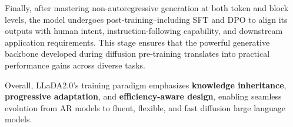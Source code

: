 Finally, after mastering non-autoregressive generation at both token and block levels, the model undergoes post-training--including SFT and DPO to align its outputs with human intent, instruction-following capability, and downstream application requirements. This stage ensures that the powerful generative backbone developed during diffusion pre-training translates into practical performance gains across diverse tasks.


Overall, LLaDA2.0’s training paradigm emphasizes \textbf{knowledge inheritance}, \textbf{progressive adaptation}, and \textbf{efficiency-aware design}, enabling seamless evolution from AR models to fluent, flexible, and fast diffusion large language models.
